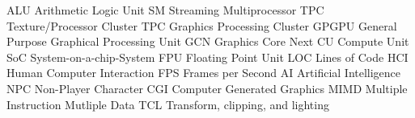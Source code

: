 \usepackage[acronyms, nonumberlist, shortcuts]{glossaries}
\makeglossaries


 {ALU} {Arithmetic Logic Unit}
 {SM} {Streaming Multiprocessor}
 {TPC} {Texture/Processor Cluster}
 {TPC} {Graphics Processing Cluster}
 {GPGPU} {General Purpose Graphical Processing Unit}
 {GCN} {Graphics Core Next}
 {CU} {Compute Unit}
 {SoC} {System-on-a-chip-System}
 {FPU} {Floating Point Unit}
 {LOC} {Lines of Code}
 {HCI} {Human Computer Interaction}
 {FPS} {Frames per Second}
 {AI} {Artificial Intelligence}
 {NPC} {Non-Player Character}
 {CGI} {Computer Generated Graphics}
 {MIMD} {Multiple Instruction Mutliple Data}
 {TCL} {Transform, clipping, and lighting}
